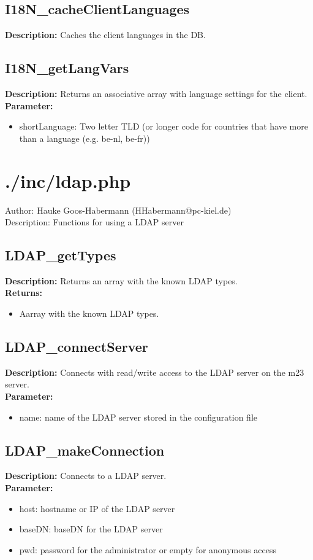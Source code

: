\subsection{I18N\_cacheClientLanguages}
\textbf{Description:} Caches the client languages in the DB.\\

\subsection{I18N\_getLangVars}
\textbf{Description:} Returns an associative array with language settings for the client.\\
\textbf{Parameter:}
\begin{itemize}
\item shortLanguage: Two letter TLD (or longer code for countries that have more than a language (e.g. be-nl, be-fr))
\end{itemize}

\newpage\section{./inc/ldap.php}
 Author: Hauke Goos-Habermann (HHabermann@pc-kiel.de)\\
 Description: Functions for using a LDAP server\\

\subsection{LDAP\_getTypes}
\textbf{Description:} Returns an array with the known LDAP types.\\
\textbf{Returns:}
\begin{itemize}
\item Aarray with the known LDAP types.
\end{itemize}

\subsection{LDAP\_connectServer}
\textbf{Description:} Connects with read/write access to the LDAP server on the m23 server.\\
\textbf{Parameter:}
\begin{itemize}
\item name: name of the LDAP server stored in the configuration file
\end{itemize}

\subsection{LDAP\_makeConnection}
\textbf{Description:} Connects to a LDAP server.\\
\textbf{Parameter:}
\begin{itemize}
\item host: hostname or IP of the LDAP server
\item baseDN: baseDN for the LDAP server
\item pwd: password for the administrator or empty for anonymous access
\end{itemize}

